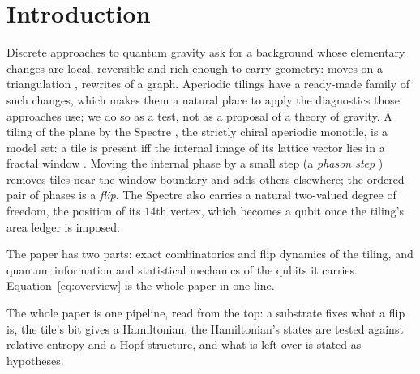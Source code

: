 \documentclass[11pt]{article}
\theoremstyle{definition}
\begin{document}
\section{Introduction}\label{sec:intro}
Discrete approaches to quantum gravity ask for a background whose elementary changes are local, reversible and rich enough to carry geometry: moves on a triangulation \cite{pachner1991}, rewrites of a graph. Aperiodic tilings have a ready-made family of such changes, which makes them a natural place to apply the diagnostics those approaches use; we do so as a test, not as a proposal of a theory of gravity. A tiling of the plane by the Spectre \cite{smith2023}, the strictly chiral aperiodic monotile, is a model set: a tile is present iff the internal image of its lattice vector lies in a fractal window \cite{bgms}. Moving the internal phase by a small step (a \emph{phason step} \cite{socolar1986}) removes tiles near the window boundary and adds others elsewhere; the ordered pair of phases is a \emph{flip}. The Spectre also carries a natural two-valued degree of freedom, the position of its $14$th vertex, which becomes a qubit once the tiling's area ledger is imposed.

The paper has two parts: exact combinatorics and flip dynamics of the tiling, and quantum information and statistical mechanics of the qubits it carries. Equation~\eqref{eq:overview} is the whole paper in one line.

The whole paper is one pipeline, read from the top: a substrate fixes what a flip is, the tile's bit gives a Hamiltonian, the Hamiltonian's states are tested against relative entropy and a Hopf structure, and what is left over is stated as hypotheses.
\end{document}
